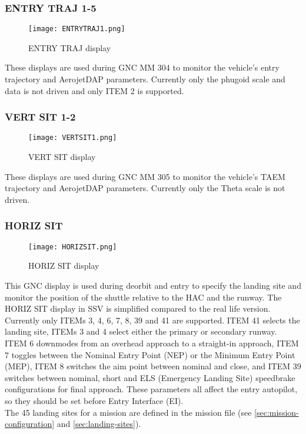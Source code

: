 \documentclass[Space_Shuttle_Vessel_Manual.tex]{subfiles}
\begin{document}
\begin{multicols*}{2}
\subsubsection{ENTRY TRAJ 1-5}
\begin{figure}[H]
  \texttt{[image: ENTRYTRAJ1.png]}
  \caption{ENTRY TRAJ display}
  \label{fig:ENTRY_TRAJ}
\end{figure}
These displays are used during GNC MM 304 to monitor the vehicle's entry trajectory and AerojetDAP parameters. Currently only the phugoid scale and data is not driven and only ITEM 2 is supported.

\subsubsection{VERT SIT 1-2}
\begin{figure}[H]
  \texttt{[image: VERTSIT1.png]}
  \caption{VERT SIT display}
  \label{fig:VERT_SIT}
\end{figure}
These displays are used during GNC MM 305 to monitor the vehicle's TAEM trajectory and AerojetDAP parameters. Currently only the Theta scale is not driven.

\subsubsection{HORIZ SIT}
\begin{figure}[H]
  \texttt{[image: HORIZSIT.png]}
  \caption{HORIZ SIT display}
  \label{fig:HORIZ_SIT}
\end{figure}
This GNC display is used during deorbit and entry to specify the landing site and monitor the position of the shuttle relative to the HAC and the runway.
The HORIZ SIT display in SSV is simplified compared to the real life version.
Currently only ITEMs 3, 4, 6, 7, 8, 39 and 41 are supported.
ITEM 41 selects the landing site, ITEMs 3 and 4 select either the primary or secondary runway. ITEM 6 downmodes from an overhead approach to a straight-in approach, ITEM 7 toggles between the Nominal Entry Point (NEP) or the Minimum Entry Point (MEP), ITEM 8 switches the aim point between nominal and close, and ITEM 39 switches between nominal, short and ELS (Emergency Landing Site) speedbrake configurations for final approach.
These parameters all affect the entry autopilot, so they should be set before Entry Interface (EI).\\
The 45 landing sites for a mission are defined in the mission file (see \ref{sec:mission-configuration} and \ref{sec:landing-sites}).


\end{multicols*}
\end{document}

